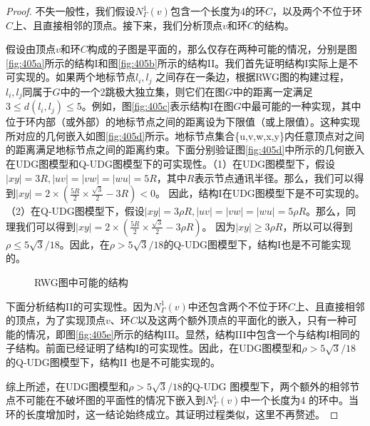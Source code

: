 \begin{proof}

不失一般性，我们假设$N_{\Gamma}^1(v)$包含一个长度为4的环$C$，以及两个不位于环$C$上、且直接相邻的顶点。接下来，我们分析顶点$v$和环$C$的结构。

假设由顶点$v$和环$C$构成的子图是平面的，那么仅存在两种可能的情况，分别是图\ref{fig:405a}所示的结构I和图\ref{fig:405b}所示的结构II。我们首先证明结构I实际上是不可实现的。如果两个地标节点$l_i,l_j$ 之间存在一条边，根据RWG图的构建过程，$l_i,l_j$同属于$G$中的一个2跳极大独立集，则它们在图$G$中的距离一定满足$3\le{d(l_i,l_j)}\le{5}$。例如，图\ref{fig:405c}表示结构I在图$G$中最可能的一种实现，其中位于环内部（或外部）的地标节点之间的距离设为下限值（或上限值）。这种实现所对应的几何嵌入如图\ref{fig:405d}所示。地标节点集合\{u,v,w,x,y\}内任意顶点对之间的距离满足地标节点之间的距离约束。下面分别验证图\ref{fig:405d}中所示的几何嵌入在UDG图模型和Q-UDG图模型下的可实现性。（1）在UDG图模型下，假设$|xy|=3R, |uv|=|vw|=|wu|=5R$，其中$R$表示节点通讯半径。那么，我们可以得到$|xy|=2\times(\frac{5R}{2}\times{\frac{\sqrt{3}}{2}}-3R)<0$。 因此，结构I在UDG图模型下是不可实现的。（2）在Q-UDG图模型下，假设$|xy|=3\rho{R}, |uv|=|vw|=|wu|=5\rho{R}$。那么，同理我们可以得到$|xy|=2\times(\frac{5R}{2}\times{\frac{\sqrt{3}}{2}}-3\rho{R})$。 因为$|xy|\ge3\rho{R}$，所以可以得到$\rho\le5\sqrt{3}/18$。因此，在$\rho>5\sqrt{3}/18$的Q-UDG图模型下，结构I也是不可能实现的。
\begin{figure}[t]
  \centering
  \caption{RWG图中可能的结构}
  \label{fig:405}
\end{figure}

下面分析结构II的可实现性。因为$N_{\Gamma}^1(v)$中还包含两个不位于环$C$上、且直接相邻的顶点，为了实现顶点$v$、环$C$以及这两个额外顶点的平面化的嵌入，只有一种可能的情况，即图\ref{fig:405e}所示的结构III。显然，结构III中包含一个与结构I相同的子结构。前面已经证明了结构I的可实现性。因此，在UDG图模型和$\rho>5\sqrt{3}/18$的Q-UDG图模型下，结构II 也是不可能实现的。

综上所述，在UDG图模型和$\rho>5\sqrt{3}/18$的Q-UDG 图模型下，两个额外的相邻节点不可能在不破坏图的平面性的情况下嵌入到$N_{\Gamma}^1(v)$中一个长度为4 的环中。当环的长度增加时，这一结论始终成立。其证明过程类似，这里不再赘述。
\end{proof}

